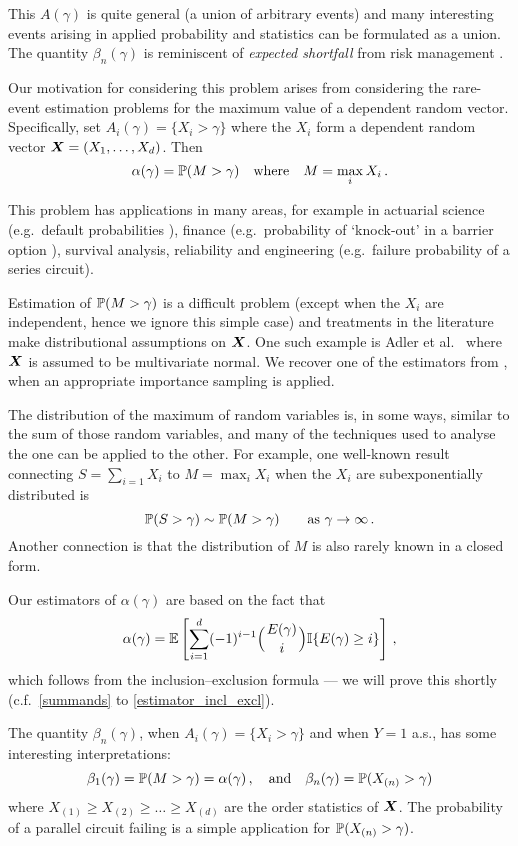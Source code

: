 This $A(\gamma)$ is quite general (a union of arbitrary events) and many interesting events arising in applied probability and statistics can be
formulated as a union. The quantity $\beta_n(\gamma)$ is reminiscent of \emph{expected shortfall} from risk management \cite{mcneil2015quantitative}.

Our motivation for considering this problem arises from considering the rare-event estimation problems for the maximum value of a dependent random vector. Specifically, set $A_i(\gamma) = \{X_i > \gamma\}$ where the $X_i$ form a dependent random vector $\bm{X} = (X_1, \dots, X_d)$. Then
\[ \alpha(\gamma) = \operatorname{{\mathbb P}}(M > \gamma) \quad \text{where} \quad M = \max_{i} X_i \,. \]

This problem has applications in many areas, for example in actuarial science (e.g.\ default probabilities \cite{asmussen2010ruin}), finance (e.g.\ probability of `knock-out' in a barrier option \cite{cont2010encyclopedia}), survival analysis, reliability \cite{rausand2004system} and engineering (e.g.\ failure probability of a series circuit).

Estimation of $\operatorname{{\mathbb P}}(M > \gamma)$ is a difficult problem (except when the $X_i$ are independent, hence we ignore this simple case) and treatments in the literature make distributional assumptions on $\bm{X}$.
One such example is Adler et al.\ \cite{adler2012efficient} where $\bm{X}$ is assumed to be multivariate normal. We recover one of the estimators from \cite{adler2012efficient}, when an appropriate importance sampling is applied.

The distribution of the maximum of random variables is, in some ways, similar to the sum of those random variables, and many of the techniques used to analyse the one can be applied to the other. For example, one well-known result connecting $S = \sum_{i=1} X_i$ to $M = \max_i X_i$ when the $X_i$ are subexponentially distributed is
\[ \operatorname{{\mathbb P}}(S > \gamma) \sim \operatorname{{\mathbb P}}(M > \gamma) \qquad \text{as } \gamma \to \infty\,. \]
Another connection is that the distribution of $M$ is also rarely known in a closed form.

Our estimators of $\alpha(\gamma)$ are based on the fact that
\[
\alpha(\gamma) = \Exp \left[ \sum_{i=1}^d (-1)^{i-1} \BigBinom{E(\gamma)}{i} \ind{E(\gamma) \ge i} \right] \,,
\]
which follows from the inclusion--exclusion formula --- we will prove this shortly (c.f.\ \eqref{summands} to \eqref{estimator_incl_excl}).

The quantity $\beta_n(\gamma)$, when $A_i(\gamma) = \{X_i > \gamma\}$ and when $Y=1$ a.s., has some interesting interpretations:
\[ \beta_1(\gamma) = \operatorname{{\mathbb P}}(M > \gamma) = \alpha(\gamma) \,, \quad \text{and} \quad
 \beta_n(\gamma) = \operatorname{{\mathbb P}}(X_{(n)} > \gamma) \]
where $X_{(1)} \ge X_{(2)} \ge \dots \ge X_{(d)}$ are the order statistics of $\bm{X}$. The probability of a parallel circuit failing is a simple application for $\operatorname{{\mathbb P}}(X_{(n)} > \gamma)$.

